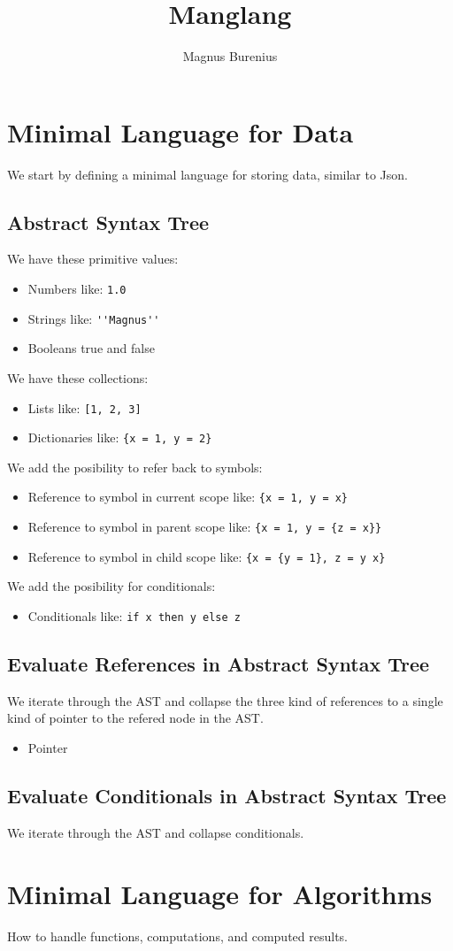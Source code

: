 \documentclass[a4paper,12pt]{article}
\title{Manglang}
\author{Magnus Burenius}
\begin{document}
\maketitle

\section{Minimal Language for Data}

We start by defining a minimal language for storing data, similar to Json.

\subsection{Abstract Syntax Tree}
We have these primitive values:
\begin{itemize}
\item Numbers like: \lstinline|1.0|
\item Strings like: \lstinline|''Magnus''|
\item Booleans true and false
\end{itemize}
We have these collections:
\begin{itemize}
\item Lists like: \lstinline|[1, 2, 3]|
\item Dictionaries like: \lstinline|{x = 1, y = 2}|
\end{itemize}
We add the posibility to refer back to symbols:
\begin{itemize}
\item Reference to symbol in current scope like: \lstinline|{x = 1, y = x}|
\item Reference to symbol in parent scope like:  \lstinline|{x = 1, y = {z = x}}|
\item Reference to symbol in child scope like:  \lstinline|{x = {y = 1}, z = y x}|
\end{itemize}
We add the posibility for conditionals:
\begin{itemize}
\item Conditionals like: \lstinline|if x then y else z|
\end{itemize}

\subsection{Evaluate References in Abstract Syntax Tree}

We iterate through the AST and collapse the three kind of references to a single kind of pointer to the refered node in the AST.

\begin{itemize}
\item Pointer
\end{itemize}

\subsection{Evaluate Conditionals in Abstract Syntax Tree}

We iterate through the AST and collapse conditionals.

\section{Minimal Language for Algorithms}

How to handle functions, computations, and computed results.
\end{document}
